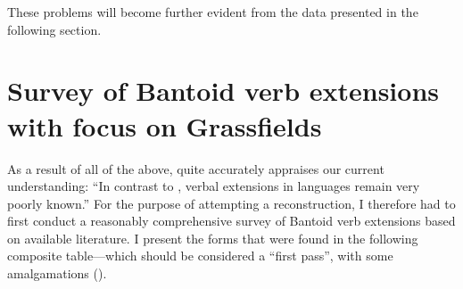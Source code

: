 \documentclass[output=paper]{langsci/langscibook}
\begin{document}
These problems will become further evident from the data presented in the following section.

\section{Survey of Bantoid verb extensions with focus on Grassfields}

As a result of all of the above, \citet[1]{Blench2011} quite accurately appraises our current understanding: “In contrast to , verbal extensions in  languages remain very poorly known.” For the purpose of attempting a reconstruction, I therefore had to first conduct a reasonably comprehensive survey of Bantoid verb extensions based on available literature. I present the forms that were found in the following composite table—which should be considered a “first pass”, with some amalgamations ().
\end{document}

